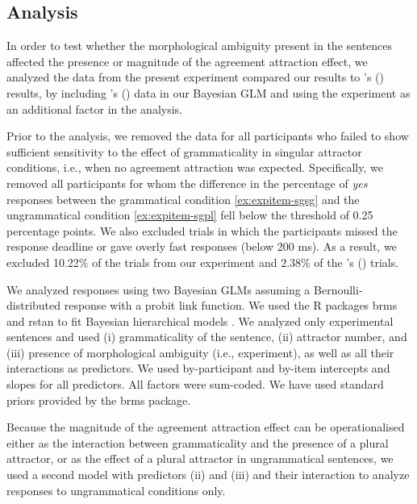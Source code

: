 \documentclass[]{interact}
\theoremstyle{plain}%
\theoremstyle{definition}
\theoremstyle{remark}
\begin{document}
\subsection{Analysis}

In order to test whether the morphological ambiguity present in the \citet{LagoEtAl:2019} sentences affected the presence or magnitude of the agreement attraction effect, we analyzed the data from the present experiment compared our results to \citeauthor{LagoEtAl:2019}'s (\citeyear{LagoEtAl:2019}) results, by including \citeauthor{LagoEtAl:2019}'s (\citeyear{LagoEtAl:2019}) data in our Bayesian GLM and using the experiment as an additional factor in the analysis.
  
Prior to the analysis, we removed the data for all participants who failed to show sufficient sensitivity to the effect of grammaticality in singular attractor conditions, i.e., when no agreement attraction was expected. Specifically, we removed all participants for whom the difference in the percentage of \textit{yes} responses between the grammatical condition \ref{ex:expitem-sgsg} and the ungrammatical condition \ref{ex:expitem-sgpl} fell below the threshold of 0.25 percentage points. We also excluded trials in which the participants missed the response deadline or gave overly fast responses (below 200 ms). As a result, we excluded 10.22\% of the trials from our experiment and 2.38\% of the \citeauthor{LagoEtAl:2019}'s (\citeyear{LagoEtAl:2019}) trials. 

We analyzed responses using two Bayesian GLMs assuming a Bernoulli-distributed response with a probit link function.  We used the R packages brms \citep{brms} and rstan \citep{rstan} to fit Bayesian hierarchical models \citep[e.g.,][]{GelmanHill:2007, NicenboimVasishth:2016}. 
We analyzed only experimental sentences and used (i) grammaticality of the sentence, (ii) attractor number, and (iii) presence of morphological ambiguity (i.e., experiment), as well as all their interactions as predictors. We used by-participant and by-item intercepts and slopes for all predictors. 
All factors were sum-coded. We have used standard priors provided by the brms package. 

Because the magnitude of the agreement attraction effect can be operationalised either as the interaction between grammaticality and the presence of a plural attractor, or as the effect of a plural attractor in ungrammatical sentences, we used a second model with predictors (ii) and (iii) and their interaction to analyze responses to ungrammatical conditions only.
\end{document}

